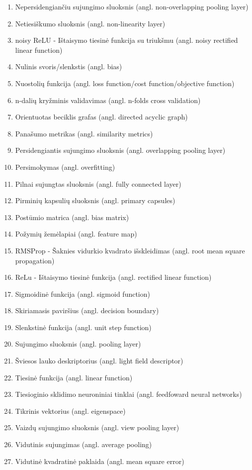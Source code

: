 \begin{enumerate}
	\item Nepersidengiančiu sujungimo sluoksnis (angl. non-overlapping pooling layer)
	\item Netiesiškumo sluoksnis (angl. non-linearity layer)
	\item noisy ReLU - Ištaisymo tiesinė funkcija su triukšmu (angl. noisy rectified linear function)
	\item Nulinis svoris/slenkstis (angl. bias)
	\item Nuostolių funkcija (angl. loss function/cost function/objective function)
	\item n-dalių kryžminis validavimas (angl. n-folds cross validation)
	\item Orientuotas beciklis grafas (angl. directed acyclic graph)
	\item Panašumo metrikas (angl. similarity metrics)
	\item Persidengiantis sujungimo sluoksnis (angl. overlapping pooling layer)
	\item Persimokymas (angl. overfitting)
	\item Pilnai sujungtas sluoksnis (angl. fully connected layer)
	\item Pirminių kapsulių sluoksnis (angl. primary capsules)
	\item Postūmio matrica (angl. bias matrix)
	\item Požymių žemėlapiai (angl. feature map)
	\item RMSProp - Šaknies vidurkio kvadrato išskleidimas (angl. root mean square propagation)
	\item ReLu - Ištaisymo tiesinė funkcija (angl. rectified linear function)
	\item Sigmoidinė funkcija (angl. sigmoid function)
	\item Skiriamasis paviršius (angl. decision boundary)
	\item Slenkstinė funkcija (angl. unit step function)
	\item Sujungimo sluoksnis (angl. pooling layer)
	\item Šviesos lauko deskriptorius (angl. light field descriptor)
	\item Tiesinė funkcija (angl. linear function)
	\item Tiesioginio sklidimo neuroniniai tinklai (angl. feedfoward neural networks)
	\item Tikrinis vektorius (angl. eigenspace)
	\item Vaizdų sujungimo sluoksnis (angl. view pooling layer)
	\item Vidutinis sujungimas (angl. average pooling)
	\item Vidutinė kvadratinė paklaida (angl. mean square error)
\end{enumerate}